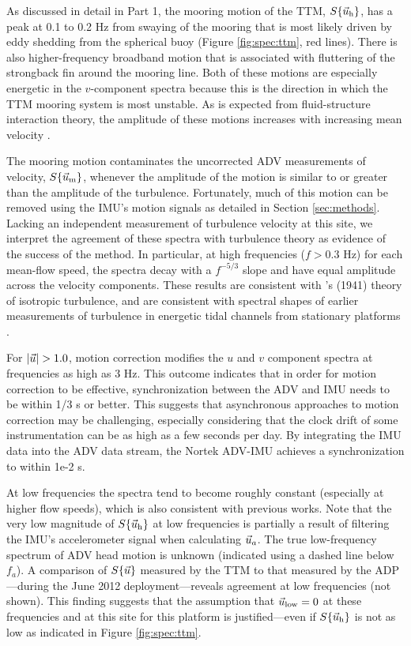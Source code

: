As discussed in detail in Part 1, the mooring motion of the TTM, $S\{\vec{u}_\mathrm{h}\}$, has a peak at 0.1 to 0.2 Hz from swaying of the mooring that is most likely driven by eddy shedding from the spherical buoy (Figure \ref{fig:spec:ttm}, red lines). There is also higher-frequency broadband motion that is associated with fluttering of the strongback fin around the mooring line. Both of these motions are especially energetic in the $v$-component spectra because this is the direction in which the TTM mooring system is most unstable. As is expected from fluid-structure interaction theory, the amplitude of these motions increases with increasing mean velocity \cite[]{Morison++1950}.

The mooring motion contaminates the uncorrected ADV measurements of velocity, $S\{\vec{u}_\mathrm{m}\}$, whenever the amplitude of the motion is similar to or greater than the amplitude of the turbulence. Fortunately, much of this motion can be removed using the IMU's motion signals as detailed in Section \ref{sec:methods}. Lacking an independent measurement of turbulence velocity at this site, we interpret the agreement of these spectra with turbulence theory as evidence of the success of the method. In particular, at high frequencies ($f>0.3$ Hz) for each mean-flow speed, the spectra decay with a $f^{-5/3}$ slope and have equal amplitude across the velocity components. These results are consistent with \citeauthor{Kolmogorov1941c}'s (1941) theory of isotropic turbulence, and are consistent with spectral shapes of earlier measurements of turbulence in energetic tidal channels from stationary platforms \cite[]{Walter++2011, Thomson++2012, McMillan++2016}.

For $|\ue|>1.0$, motion correction modifies the $u$ and $v$ component spectra at frequencies as high as 3 Hz. This outcome indicates that in order for motion correction to be effective, synchronization between the ADV and IMU needs to be within 1/3 s or better. This suggests that asynchronous approaches to motion correction may be challenging, especially considering that the clock drift of some instrumentation can be as high as a few seconds per day. By integrating the IMU data into the ADV data stream, the Nortek ADV-IMU achieves a synchronization to within 1e-2 s. 

At low frequencies the spectra tend to become roughly constant (especially at higher flow speeds), which is also consistent with previous works. Note that the very low magnitude of $S\{\vec{u}_\mathrm{h}\}$ at low frequencies is partially a result of filtering the IMU's accelerometer signal when calculating $\vec{u}_a$. The true low-frequency spectrum of ADV head motion is unknown (indicated using a dashed line below $f_a$). A comparison of $S\{\vec{u}\}$ measured by the TTM to that measured by the ADP---during the June 2012 deployment---reveals agreement at low frequencies (not shown). This finding suggests that the assumption that $\vec{u}_\mathrm{low}=0$ at these frequencies and at this site for this platform is justified---even if $S\{\vec{u}_\mathrm{h}\}$ is not as low as indicated in Figure \ref{fig:spec:ttm}.

